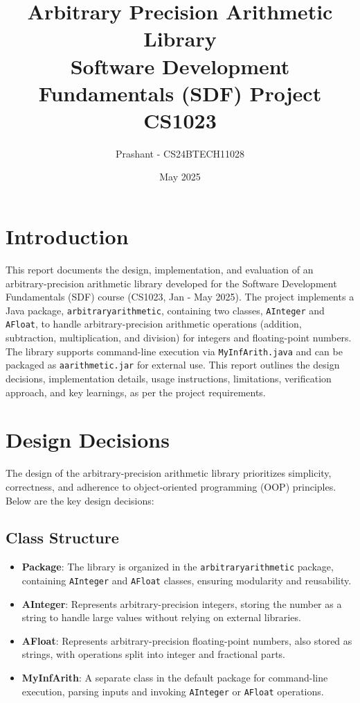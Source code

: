 \documentclass[12pt]{article}
\title{Arbitrary Precision Arithmetic Library \\ Software Development Fundamentals (SDF) Project \\ CS1023}
\author{Prashant - CS24BTECH11028}
\date{May 2025}
\begin{document}
\maketitle
\tableofcontents
\newpage

\section{Introduction}
This report documents the design, implementation, and evaluation of an arbitrary-precision arithmetic library developed for the Software Development Fundamentals (SDF) course (CS1023, Jan - May 2025). The project implements a Java package, \texttt{arbitraryarithmetic}, containing two classes, \texttt{AInteger} and \texttt{AFloat}, to handle arbitrary-precision arithmetic operations (addition, subtraction, multiplication, and division) for integers and floating-point numbers. The library supports command-line execution via \texttt{MyInfArith.java} and can be packaged as \texttt{aarithmetic.jar} for external use. This report outlines the design decisions, implementation details, usage instructions, limitations, verification approach, and key learnings, as per the project requirements.

\section{Design Decisions}
The design of the arbitrary-precision arithmetic library prioritizes simplicity, correctness, and adherence to object-oriented programming (OOP) principles. Below are the key design decisions:

\subsection{Class Structure}
\begin{itemize}
    \item \textbf{Package}: The library is organized in the \texttt{arbitraryarithmetic} package, containing \texttt{AInteger} and \texttt{AFloat} classes, ensuring modularity and reusability.
    \item \textbf{AInteger}: Represents arbitrary-precision integers, storing the number as a string to handle large values without relying on external libraries.
    \item \textbf{AFloat}: Represents arbitrary-precision floating-point numbers, also stored as strings, with operations split into integer and fractional parts.
    \item \textbf{MyInfArith}: A separate class in the default package for command-line execution, parsing inputs and invoking \texttt{AInteger} or \texttt{AFloat} operations.
\end{itemize}
\end{document}
